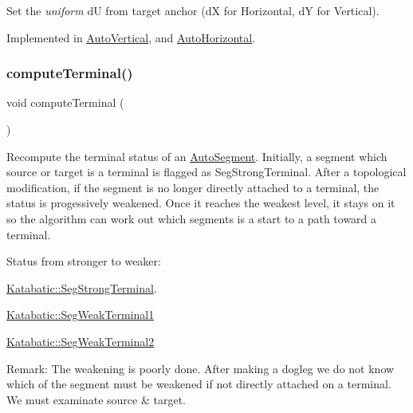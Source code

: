 Set the {\itshape uniform} {\ttfamily dU} from target anchor (dX for Horizontal, dY for Vertical). 

Implemented in \mbox{\hyperlink{classKatabatic_1_1AutoVertical_a9df2ef68c1fbf4159cc837be5c699b53}{Auto\+Vertical}}, and \mbox{\hyperlink{classKatabatic_1_1AutoHorizontal_a9df2ef68c1fbf4159cc837be5c699b53}{Auto\+Horizontal}}.

\mbox{\label{classKatabatic_1_1AutoSegment_abc72aaeefa7450eaf67aee3212ec974d}} 
\subsubsection{\texorpdfstring{compute\+Terminal()}{computeTerminal()}}
{\footnotesize\ttfamily void compute\+Terminal (\begin{DoxyParamCaption}{ }\end{DoxyParamCaption})}

Recompute the terminal status of an \mbox{\hyperlink{classKatabatic_1_1AutoSegment}{Auto\+Segment}}. Initially, a segment which source or target is a terminal is flagged as Seg\+Strong\+Terminal. After a topological modification, if the segment is no longer directly attached to a terminal, the status is progessively weakened. Once it reaches the weakest level, it stays on it so the algorithm can work out which segments is a start to a path toward a terminal.

Status from stronger to weaker\+:
\begin{DoxyItemize}
\item \mbox{\hyperlink{namespaceKatabatic_a94585537ee1724ea9315578ec54380f4a93251a6b8197685e2aaf77a760851557}{Katabatic\+::\+Seg\+Strong\+Terminal}}.
\item \mbox{\hyperlink{namespaceKatabatic_a94585537ee1724ea9315578ec54380f4a7b3e09b8ab4cf676fd308535d7fba892}{Katabatic\+::\+Seg\+Weak\+Terminal1}}
\item \mbox{\hyperlink{namespaceKatabatic_a94585537ee1724ea9315578ec54380f4a32f77fa2da27348bcfc294a039efd766}{Katabatic\+::\+Seg\+Weak\+Terminal2}}
\end{DoxyItemize}

\begin{DoxyParagraph}{Remark\+: The weakening is poorly done. After making a dogleg we do not}
know which of the segment must be weakened if not directly attached on a terminal. We must examinate source \& target. 
\end{DoxyParagraph}


